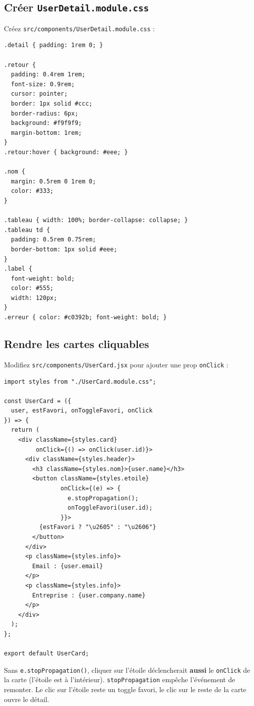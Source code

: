 \documentclass[11pt,a4paper]{article}
\begin{document}
\subsection{Créer \texttt{UserDetail.module.css}}

Créez \texttt{src/components/UserDetail.module.css} :

\begin{lstlisting}[style=css]
.detail { padding: 1rem 0; }

.retour {
  padding: 0.4rem 1rem;
  font-size: 0.9rem;
  cursor: pointer;
  border: 1px solid #ccc;
  border-radius: 6px;
  background: #f9f9f9;
  margin-bottom: 1rem;
}
.retour:hover { background: #eee; }

.nom {
  margin: 0.5rem 0 1rem 0;
  color: #333;
}

.tableau { width: 100%; border-collapse: collapse; }
.tableau td {
  padding: 0.5rem 0.75rem;
  border-bottom: 1px solid #eee;
}
.label {
  font-weight: bold;
  color: #555;
  width: 120px;
}
.erreur { color: #c0392b; font-weight: bold; }
\end{lstlisting}

\subsection{Rendre les cartes cliquables}

Modifiez \texttt{src/components/UserCard.jsx} pour ajouter une prop \texttt{onClick} :

\begin{lstlisting}
import styles from "./UserCard.module.css";

const UserCard = ({
  user, estFavori, onToggleFavori, onClick
}) => {
  return (
    <div className={styles.card}
         onClick={() => onClick(user.id)}>
      <div className={styles.header}>
        <h3 className={styles.nom}>{user.name}</h3>
        <button className={styles.etoile}
                onClick={(e) => {
                  e.stopPropagation();
                  onToggleFavori(user.id);
                }}>
          {estFavori ? "\u2605" : "\u2606"}
        </button>
      </div>
      <p className={styles.info}>
        Email : {user.email}
      </p>
      <p className={styles.info}>
        Entreprise : {user.company.name}
      </p>
    </div>
  );
};

export default UserCard;
\end{lstlisting}

\begin{attentionbox}
Sans \texttt{e.stopPropagation()}, cliquer sur l'étoile déclencherait \textbf{aussi} le \texttt{onClick} de la carte (l'étoile est à l'intérieur). \texttt{stopPropagation} empêche l'événement de remonter. Le clic sur l'étoile reste un toggle favori, le clic sur le reste de la carte ouvre le détail.
\end{attentionbox}
\end{document}
